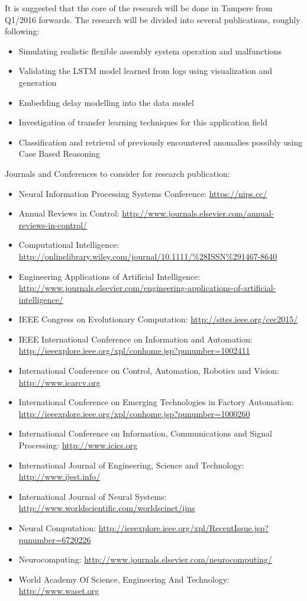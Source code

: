 \documentclass[a4paper,10pt]{article}
\begin{document}
It is suggested that the core of the research will be done in Tampere from Q1/2016 forwards.
The research will be divided into several publications, roughly following:
\begin{itemize}
 \item Simulating realistic flexible assembly system operation and malfunctions
 \item Validating the LSTM model learned from logs using visualization and generation
 \item Embedding delay modelling into the data model
 \item Investigation of transfer learning techniques for this application field
 \item Classification and retrieval of previously encountered anomalies possibly using Case Based Reasoning
\end{itemize}
Journals and Conferences to consider for research publication:
\begin{itemize}
 \item Neural Information Processing Systems Conference: \url{https://nips.cc/}
 \item Annual Reviews in Control: \url{http://www.journals.elsevier.com/annual-reviews-in-control/}
 \item Computational Intelligence: \url{http://onlinelibrary.wiley.com/journal/10.1111/%28ISSN%291467-8640}
 \item Engineering Applications of Artificial Intelligence: \url{http://www.journals.elsevier.com/engineering-applications-of-artificial-intelligence/}
 \item IEEE Congress on Evolutionary Computation: \url{http://sites.ieee.org/cec2015/}
 \item IEEE International Conference on Information and Automation: \url{http://ieeexplore.ieee.org/xpl/conhome.jsp?punumber=1002411}
 \item International Conference on Control, Automation, Robotics and Vision: \url{http://www.icarcv.org}
 \item International Conference on Emerging Technologies in Factory Automation: \url{http://ieeexplore.ieee.org/xpl/conhome.jsp?punumber=1000260}
 \item International Conference on Information, Communications and Signal Processing: \url{http://www.icics.org}
 \item International Journal of Engineering, Science and Technology: \url{http://www.ijest.info/}
 \item International Journal of Neural Systems: \url{http://www.worldscientific.com/worldscinet/ijns}
 \item Neural Computation: \url{http://ieeexplore.ieee.org/xpl/RecentIssue.jsp?punumber=6720226}
 \item Neurocomputing: \url{http://www.journals.elsevier.com/neurocomputing/}
 \item World Academy Of Science, Engineering And Technology: \url{http://www.waset.org}
\end{itemize}
\end{document}
